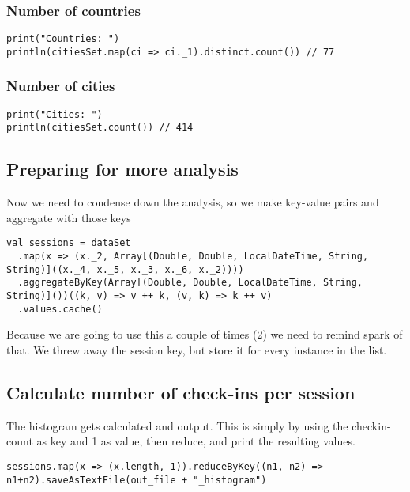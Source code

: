 \documentclass[abstract=on]{article}
\begin{document}
\subsubsection{Number of countries}
\begin{lstlisting}
print("Countries: ")
println(citiesSet.map(ci => ci._1).distinct.count()) // 77
\end{lstlisting}

\subsubsection{Number of cities}
\begin{lstlisting}
print("Cities: ")
println(citiesSet.count()) // 414
\end{lstlisting}



\subsection{Preparing for more analysis}
Now we need to condense down the analysis, so we make key-value pairs and aggregate with those keys
\begin{lstlisting}
val sessions = dataSet
  .map(x => (x._2, Array[(Double, Double, LocalDateTime, String, String)]((x._4, x._5, x._3, x._6, x._2))))
  .aggregateByKey(Array[(Double, Double, LocalDateTime, String, String)]())((k, v) => v ++ k, (v, k) => k ++ v)
  .values.cache()
\end{lstlisting}
Because we are going to use this a couple of times (2) we need to remind spark of that.
We threw away the session key, but store it for every instance in the list.


\subsection{Calculate number of check-ins per session}
The histogram gets calculated and output.
This is simply by using the checkin-count as key and 1 as value, then reduce, and print the resulting values.
\begin{lstlisting}
sessions.map(x => (x.length, 1)).reduceByKey((n1, n2) => n1+n2).saveAsTextFile(out_file + "_histogram")
\end{lstlisting}

\end{document}
